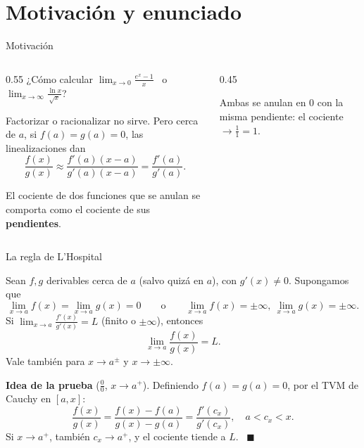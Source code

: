 \documentclass[10pt,aspectratio=169]{beamer}
\begin{document}
\section{Motivación y enunciado}

\begin{frame}{Motivación}
  \begin{columns}
    \begin{column}{0.55\textwidth}
      ¿Cómo calcular $\displaystyle\lim_{x\to0}\frac{e^x-1}{x}$ \ o \ $\displaystyle\lim_{x\to\infty}\frac{\ln x}{\sqrt x}$?
      \medskip

      Factorizar o racionalizar no sirve. Pero cerca de $a$, si $f(a)=g(a)=0$, las linealizaciones dan
      \[ \frac{f(x)}{g(x)}\approx\frac{f'(a)(x-a)}{g'(a)(x-a)}=\frac{f'(a)}{g'(a)}. \]
      \begin{idea}
        El cociente de dos funciones que se anulan se comporta como el cociente de sus \textbf{pendientes}.
      \end{idea}
    \end{column}
    \begin{column}{0.45\textwidth}
      \centering

      \small Ambas se anulan en $0$ con la misma pendiente: el cociente $\to\frac11=1$.
    \end{column}
  \end{columns}
\end{frame}

\begin{frame}{La regla de L'Hospital}
  \begin{teorema}[L'Hospital]
    Sean $f,g$ derivables cerca de $a$ (salvo quizá en $a$), con $g'(x)\neq0$. Supongamos que
    \[ \lim_{x\to a}f(x)=\lim_{x\to a}g(x)=0\qquad\text{o}\qquad\lim_{x\to a}f(x)=\pm\infty,\ \lim_{x\to a}g(x)=\pm\infty. \]
    Si $\displaystyle\lim_{x\to a}\frac{f'(x)}{g'(x)}=L$ (finito o $\pm\infty$), entonces
    \[ \lim_{x\to a}\frac{f(x)}{g(x)}=L. \]
    Vale también para $x\to a^\pm$ y $x\to\pm\infty$.
  \end{teorema}
  \textbf{Idea de la prueba} ($\frac00$, $x\to a^+$). Definiendo $f(a)=g(a)=0$, por el TVM de Cauchy en $[a,x]$:
  \[ \frac{f(x)}{g(x)}=\frac{f(x)-f(a)}{g(x)-g(a)}=\frac{f'(c_x)}{g'(c_x)},\quad a<c_x<x. \]
  Si $x\to a^+$, también $c_x\to a^+$, y el cociente tiende a $L$. \ $\blacksquare$
\end{frame}
\end{document}
